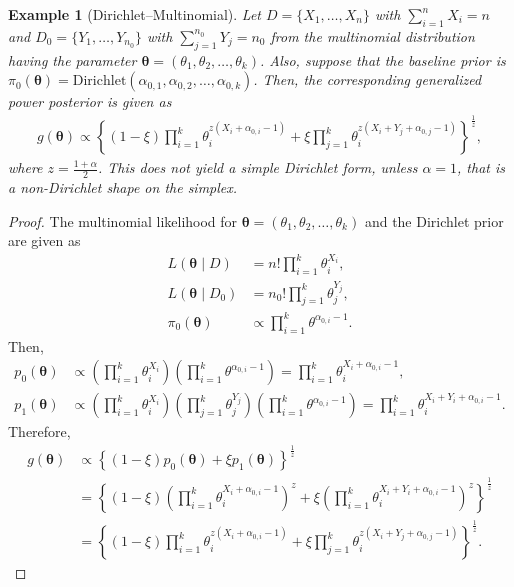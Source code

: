 \documentclass[12pt]{article}
\newtheorem{example}{Example}
\begin{document}
\begin{example}[Dirichlet–Multinomial]
    Let $D = \{X_1,\dots,X_n\}$ with $\sum^n_{i=1 }X_i = n$ and $D_0 = \{Y_1,\dots,Y_{n_0}\}$ with $\sum^{n_0}_{j=1}Y_j = n_0$ from the multinomial distribution having the parameter $\bm{\theta} = (\theta_1,\theta_2,\dots,\theta_k)$.
    Also, suppose that the baseline prior is $\pi_0(\bm{\theta}) = \mathrm{Dirichlet}(\alpha_{0,1},\alpha_{0,2},\dots,\alpha_{0,k})$.
    Then, the corresponding generalized power posterior is given as
    \begin{align*}
        g(\bm{\theta}) \propto \left\{(1 - \xi)\prod^k_{i=1}\theta_i^{z(X_i + \alpha_{0,i} - 1)} + \xi \prod^k_{j=1}\theta_i^{z(X_i + Y_j + \alpha_{0,j} - 1)} \right\}^{\frac{1}{z}},
    \end{align*}
    where $z = \frac{1 + \alpha}{2}$.
    This does not yield a simple Dirichlet form, unless $\alpha = 1$, that is a non-Dirichlet shape on the simplex.
\end{example}
\begin{proof}
    The multinomial likelihood for $\bm{\theta} = (\theta_1,\theta_2,\dots,\theta_k)$ and the Dirichlet prior are given as
    \begin{align*}
        L(\bm{\theta} \mid D) &= n!\prod^k_{i=1}\theta_i^{X_i}, \\
        L(\bm{\theta} \mid D_0) &= n_0!\prod^k_{j=1}\theta_j^{Y_j}, \\
        \pi_0(\bm{\theta}) &\propto \prod^k_{i=1}\theta^{\alpha_{0,i} - 1}.
    \end{align*}
    Then,
    \begin{align*}
        p_0(\bm{\theta}) &\propto \left(\prod^k_{i=1}\theta_i^{X_i}\right)\left(\prod^k_{i=1}\theta^{\alpha_{0,i} - 1}\right) = \prod^k_{i=1}\theta_i^{X_i + \alpha_{0,i} - 1}, \\
        p_1(\bm{\theta}) &\propto \left(\prod^k_{i=1}\theta_i^{X_i}\right)\left(\prod^k_{j=1}\theta_j^{Y_j}\right)\left(\prod^k_{i=1}\theta^{\alpha_{0,i} - 1}\right) = \prod^k_{i=1}\theta_i^{X_i + Y_i + \alpha_{0,i} - 1}.
    \end{align*}
    Therefore,
    \begin{align*}
        g(\bm{\theta}) &\propto \left\{ (1 - \xi) p_0(\bm{\theta}) + \xi p_1(\bm{\theta}) \right\}^{\frac{1}{z}} \\ 
        &= \left\{(1 - \xi) \left(\prod^k_{i=1}\theta_i^{X_i + \alpha_{0,i} - 1}\right)^z + \xi\left(\prod^k_{i=1}\theta_i^{X_i + Y_i + \alpha_{0,i} - 1}\right)^z \right\}^{\frac{1}{z}} \\
        &= \left\{(1 - \xi)\prod^k_{i=1}\theta_i^{z(X_i + \alpha_{0,i} - 1)} + \xi \prod^k_{j=1}\theta_i^{z(X_i + Y_j + \alpha_{0,j} - 1)} \right\}^{\frac{1}{z}}.
    \end{align*}
\end{proof}
\end{document}
